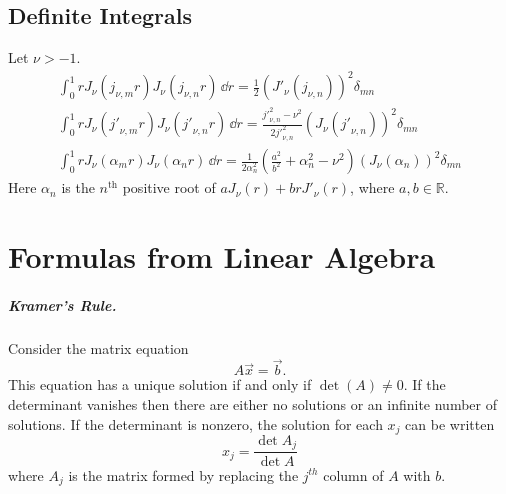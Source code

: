 
\section{Definite Integrals}

Let $\nu > -1$.
\begin{gather*}
  \int_0^1 r J_\nu(j_{\nu,m} r) J_\nu(j_{\nu,n} r) \,\dd r 
  = \frac{1}{2} \left( {J'}_\nu(j_{\nu,n}) \right)^2 \delta_{m n} 
  \\
  \int_0^1 r J_\nu({j'}_{\nu,m} r) J_\nu({j'}_{\nu,n} r) \,\dd r 
  = \frac{{j'}_{\nu,n}^2 - \nu^2}{2 {j'}_{\nu,n}^2} 
  \left( J_\nu({j'}_{\nu,n}) \right)^2 \delta_{m n} 
  \\
  \int_0^1 r J_\nu(\alpha_m r) J_\nu(\alpha_n r) \,\dd r 
  = \frac{1}{2 \alpha_n^2} \left( \frac{a^2}{b^2}
    + \alpha_n^2 - \nu^2 \right)
  \left( J_\nu(\alpha_n) \right)^2 \delta_{m n}
\end{gather*}
Here $\alpha_n$ is the $n^{\mathrm{th}}$ positive root of 
$a J_\nu(r) + b r {J'}_\nu(r)$, where $a,b \in \mathbb{R}$.







\raggedbottom
\chapter{Formulas from Linear Algebra}
\label{appendix formulas from linear algebra}
\flushbottom

\paragraph{Kramer's Rule.}

Consider the matrix equation
\[ A \vec{x} = \vec{b}. \]
This equation has a unique solution if and only if $\det(A) \neq 0$.  
If the determinant vanishes then there are either no solutions or an 
infinite number of solutions.
If the determinant is nonzero, the solution for each $x_j$ can be written
\[ x_j = \frac{\det A_j}{\det A} \]
where $A_j$ is the matrix formed by replacing the $j^{t h}$ column of $A$ 
with $b$.

